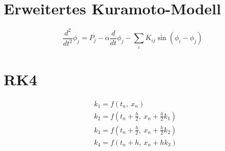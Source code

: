 \documentclass[11pt,a4paper,titlepage]{article}
\begin{document}
\section{Erweitertes Kuramoto-Modell}
\begin{equation}
	\frac{d^2}{dt^2}\phi_j=P_j-\alpha\frac{d}{dt}\phi_j-\sum_iK_{ij}\sin{(\phi_i-\phi_j)}
\end{equation}
\section{RK4}
\begin{align}
	\nonumber
	&k_1=f(t_n, \ x_n) \\
	\nonumber
	&k_2=f(t_n+\frac{h}{2}, \ x_n+\frac{h}{2}k_1) \\
	\nonumber
	&k_3=f(t_n+\frac{h}{2}, \ x_n+\frac{h}{2}k_2) \\
	\nonumber
	&k_4=f(t_n+h, \ x_n+hk_3) \\
\end{align}
\end{document}
